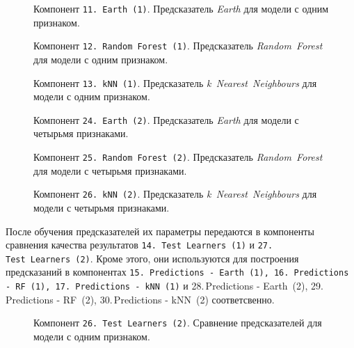 \begin{figure}[H]
    \caption{Компонент \texttt{11.\,Earth~(1)}. Предсказатель \textit{Earth} для модели с одним признаком.}
    \label{img:11-Earth-1}
\end{figure}

\begin{figure}[H]
    \center{\texttt{[image: 12-RF-1]}}
    \caption{Компонент \texttt{12.\,Random~Forest~(1)}. Предсказатель \textit{Random~Forest} для модели с одним признаком.}
    \label{img:12-RF-1}
\end{figure}

\begin{figure}[H]
    \caption{Компонент \texttt{13.\,kNN~(1)}. Предсказатель \textit{k~Nearest~Neighbours} для модели с одним признаком.}
    \label{img:13-kNN-1}
\end{figure}

\begin{figure}[H]
    \caption{Компонент \texttt{24.\,Earth~(2)}. Предсказатель \textit{Earth} для модели с четырьмя признаками.}
    \label{img:24-Earth-2}
\end{figure}

\begin{figure}[H]
    \center{\texttt{[image: 25-RF-2]}}
    \caption{Компонент \texttt{25.\,Random~Forest~(2)}. Предсказатель \textit{Random~Forest} для модели с четырьмя признаками.}
    \label{img:25-RF-2}
\end{figure}

\begin{figure}[H]
    \caption{Компонент \texttt{26.\,kNN~(2)}. Предсказатель \textit{k~Nearest~Neighbours} для модели с четырьмя признаками.}
    \label{img:26-kNN-2}
\end{figure}

После обучения предсказателей их параметры передаются в компоненты сравнения качества результатов \texttt{14.\,Test~Learners~(1)} и \texttt{27.\,Test~Learners~(2)}. Кроме этого, они используются для построения предсказаний в компонентах \texttt{15.\,Predictions - Earth~(1), 16.\,Predictions - RF~(1), 17.\,Predictions - kNN~(1)} и {28.\,Predictions - Earth~(2), 29.\,Predictions - RF~(2), 30.\,Predictions - kNN~(2)} соответсвенно.

\begin{figure}[H]
    \caption{Компонент \texttt{26.\,Test~Learners~(2)}. Сравнение предсказателей для модели с одним признаком.}
    \label{img:14-Test-Learners-1}
\end{figure}

